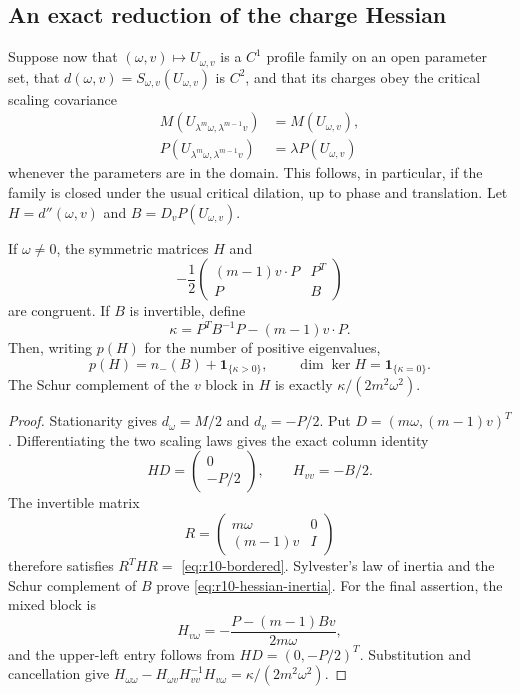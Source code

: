 \subsection{An exact reduction of the charge Hessian}

Suppose now that $(\omega,v)\mapsto U_{\omega,v}$ is a $C^1$
profile family on an open parameter set, that
$d(\omega,v)=S_{\omega,v}(U_{\omega,v})$ is $C^2$, and that its
charges obey the critical scaling covariance
\begin{align*}
 M(U_{\lambda^m\omega,\lambda^{m-1}v})&=M(U_{\omega,v}),\\
 P(U_{\lambda^m\omega,\lambda^{m-1}v})&=\lambda P(U_{\omega,v})
\end{align*}
whenever the parameters are in the domain.  This follows, in
particular, if the family is closed under the usual critical dilation,
up to phase and translation.  Let $H=d''(\omega,v)$ and
$B=D_vP(U_{\omega,v})$.

\begin{theorem}
\label{thm:r10-bordered}
If $\omega\ne0$, the symmetric matrices $H$ and
\begin{equation}\label{eq:r10-bordered}
 -\frac12
 \begin{pmatrix}
 (m-1)v\cdot P&P^T\\
 P&B
 \end{pmatrix}
\end{equation}
are congruent.  If $B$ is invertible, define
\begin{equation}\label{eq:r10-kappa}
 \kappa=P^TB^{-1}P-(m-1)v\cdot P.
\end{equation}
Then, writing $p(H)$ for the number of positive eigenvalues,
\begin{equation}\label{eq:r10-hessian-inertia}
 p(H)=n_-(B)+\mathbf1_{\{\kappa>0\}},
 \qquad \dim\ker H=\mathbf1_{\{\kappa=0\}}.
\end{equation}
The Schur complement of the $v$ block in $H$ is exactly
$\kappa/(2m^2\omega^2)$.
\end{theorem}
\begin{proof}
Stationarity gives $d_\omega=M/2$ and $d_v=-P/2$.
Put $D=(m\omega,(m-1)v)^T$.  Differentiating the two scaling laws
gives the exact column identity
\[
 HD=\begin{pmatrix}0\\-P/2\end{pmatrix},
 \qquad H_{vv}=-B/2.
\]
The invertible matrix
\[
 R=\begin{pmatrix}m\omega&0\\(m-1)v&I\end{pmatrix}
\]
therefore satisfies $R^THR=$ \eqref{eq:r10-bordered}.
Sylvester's law of inertia and the Schur complement of $B$ prove
\eqref{eq:r10-hessian-inertia}.
For the final assertion, the mixed block is
\[
 H_{v\omega}=-\frac{P-(m-1)Bv}{2m\omega},
\]
and the upper-left entry follows from $HD=(0,-P/2)^T$.
Substitution and cancellation give
$H_{\omega\omega}-H_{\omega v}H_{vv}^{-1}H_{v\omega}
=\kappa/(2m^2\omega^2)$.
\end{proof}

